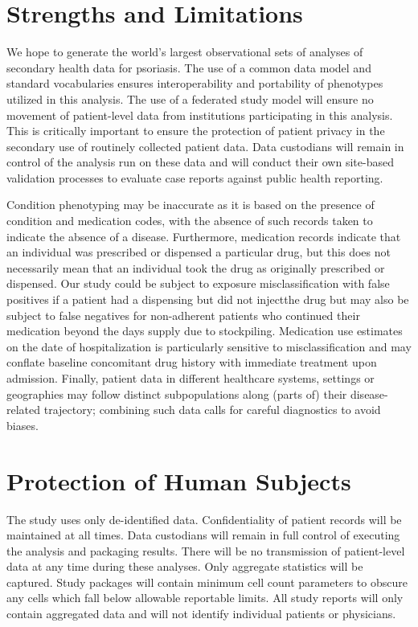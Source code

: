 \documentclass[
  12pt,
]{article}
\begin{document}
\hypertarget{strengths-limitations}{%
\section{Strengths and Limitations}\label{strengths-limitations}}

We hope to generate the world's largest observational sets of analyses of secondary health data for psoriasis. The use of a common data model and standard vocabularies ensures interoperability and portability of phenotypes utilized in this analysis. The use of a federated study model will ensure no movement of patient-level data from institutions participating in this analysis. This is critically important to ensure the protection of patient privacy in the secondary use of routinely collected patient data. Data custodians will remain in control of the analysis run on these data and will conduct their own site-based validation processes to evaluate case reports against public health reporting.

Condition phenotyping may be inaccurate as it is based on the presence of condition and medication codes, with the absence of such records taken to indicate the absence of a disease. Furthermore, medication records indicate that an individual was prescribed or dispensed a particular drug, but this does not necessarily mean that an individual took the drug as originally prescribed or dispensed. Our study could be subject to exposure misclassification with false positives if a patient had a dispensing but did not injectthe drug but may also be subject to false negatives for non-adherent patients who continued their medication beyond the days supply due to stockpiling. Medication use estimates on the date of hospitalization is particularly sensitive to misclassification and may conflate baseline concomitant drug history with immediate treatment upon admission. Finally, patient data in different healthcare systems, settings or geographies may follow distinct subpopulations along (parts of) their disease-related trajectory; combining such data calls for careful diagnostics to avoid biases.

\hypertarget{protection-of-human-subjects}{%
\section{Protection of Human Subjects}\label{protection-of-human-subjects}}

The study uses only de-identified data. Confidentiality of patient records will be maintained at all times. Data custodians will remain in full control of executing the analysis and packaging results. There will be no transmission of patient-level data at any time during these analyses. Only aggregate statistics will be captured. Study packages will contain minimum cell count parameters to obscure any cells which fall below allowable reportable limits. All study reports will only contain aggregated data and will not identify individual patients or physicians.
\end{document}
